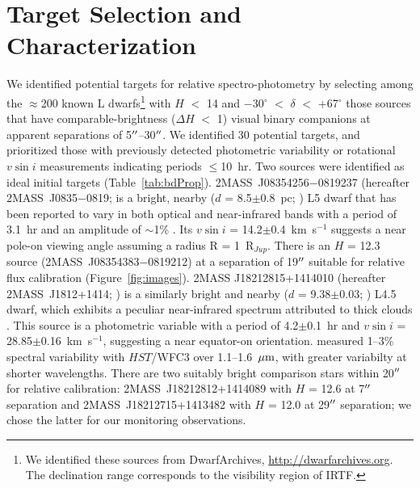 \documentclass[twocolumn]{aastex6}
\newcommand{\degree}{$^\circ$}
\newcommand{\kms}{km~s$^{-1}$}
\newcommand{\rjup}{R$_{Jup}$}
\newcommand{\sha}{2MASS~J0835$-$0819}
\newcommand{\shb}{2MASS~J1812+1414}
\begin{document}
\section{Target Selection and Characterization}\label{sec:targets}

We identified potential targets for relative spectro-photometry by selecting among the $\approx$200 known L dwarfs\footnote{We identified these sources from DwarfArchives,  \url{http://dwarfarchives.org}. The declination range corresponds to the visibility region of IRTF.} with $H$ $<$ 14 and $-$30{\degree}  $<$ $\delta$ $<$ +67{\degree} those sources that have comparable-brightness ($\Delta{H}$ $<$ 1) visual binary companions at apparent separations of 5$\mbox{$^{\prime\prime}$}$--30$\mbox{$^{\prime\prime}$}$. We identified 30 potential targets, and prioritized those with previously detected photometric variability or rotational $v\sin{i}$ measurements indicating periods $\leq$10~hr.  Two sources were identified as ideal initial targets (Table~\ref{tab:bdProp}).
2MASS~J08354256$-$0819237 (hereafter {\sha}; \citealt{2003AJ....126.2421C} is a bright, nearby ($d$ = 8.5$\pm$0.8~pc; \citealt{2012ApJ...752...56F}) L5 dwarf that has been reported to vary in both optical and near-infrared bands with a period of 3.1~hr and an amplitude of $\sim$1\%  \citep{2004MNRAS.354..378K,2014A&A...566A.111W}. Its $v\sin{i}$ = 14.2$\pm$0.4~{\kms} \citep{2010ApJ...723..684B} suggests a near pole-on viewing angle assuming a radius R = 1~{\rjup}. There is an $H$ = 12.3 source (2MASS~J08354383$-$0819212) at a separation of 19$\mbox{$^{\prime\prime}$}$ suitable for relative flux calibration (Figure~\ref{fig:images}). 
2MASS J18212815+1414010 (hereafter {\shb}; \citealt{2008ApJ...686..528L}) is a similarly bright and nearby ($d$ = 9.38$\pm$0.03; \citealt{2016MNRAS.455..357S}) L4.5 dwarf, which exhibits a peculiar near-infrared spectrum attributed to thick clouds \citep{2008ApJ...686..528L,2015ApJS..219...33G}. This source is a photometric variable with a period of 4.2$\pm$0.1~hr \citep{2015ApJ...799..154M} and $v\sin{i}$ = 28.85$\pm$0.16~{\kms}, suggesting a near equator-on orientation.  \citet{2015ApJ...798L..13Y} measured 1--3\% spectral variability with $HST$/WFC3 over 1.1--1.6~$\mbox{$\mu$m}$, with greater variabilty at shorter wavelengths. There are two suitably bright comparison stars within 20$\mbox{$^{\prime\prime}$}$ for relative calibration: 2MASS~J18212812+1414089 with $H$ = 12.6 at 7$\mbox{$^{\prime\prime}$}$ separation and 2MASS~J18212715+1413482 with $H$ = 12.0 at 29$\mbox{$^{\prime\prime}$}$ separation; we chose the latter for our monitoring observations.
\end{document}
